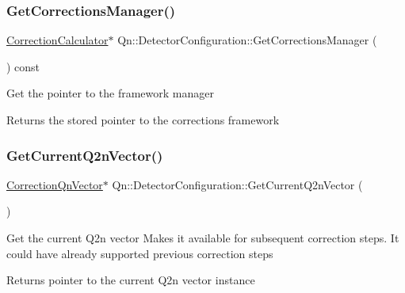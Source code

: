 \mbox{\label{classQn_1_1DetectorConfiguration_a20a27b09e0d2f3209b8de97906c52711}} 
\subsubsection{\texorpdfstring{Get\+Corrections\+Manager()}{GetCorrectionsManager()}}
{\footnotesize\ttfamily \mbox{\hyperlink{classQn_1_1CorrectionCalculator}{Correction\+Calculator}}$\ast$ Qn\+::\+Detector\+Configuration\+::\+Get\+Corrections\+Manager (\begin{DoxyParamCaption}{ }\end{DoxyParamCaption}) const\hspace{0.3cm}{\ttfamily [inline]}}

Get the pointer to the framework manager \begin{DoxyReturn}{Returns}
the stored pointer to the corrections framework 
\end{DoxyReturn}
\mbox{\label{classQn_1_1DetectorConfiguration_a8f2e955fc14f8db870a89fc4ab1dc36b}} 
\subsubsection{\texorpdfstring{Get\+Current\+Q2n\+Vector()}{GetCurrentQ2nVector()}}
{\footnotesize\ttfamily \mbox{\hyperlink{classQn_1_1CorrectionQnVector}{Correction\+Qn\+Vector}}$\ast$ Qn\+::\+Detector\+Configuration\+::\+Get\+Current\+Q2n\+Vector (\begin{DoxyParamCaption}{ }\end{DoxyParamCaption})\hspace{0.3cm}{\ttfamily [inline]}}

Get the current Q2n vector Makes it available for subsequent correction steps. It could have already supported previous correction steps \begin{DoxyReturn}{Returns}
pointer to the current Q2n vector instance 
\end{DoxyReturn}
\mbox{\label{classQn_1_1DetectorConfiguration_ae467babb14df7f6b264eb379dceff2dd}} 
